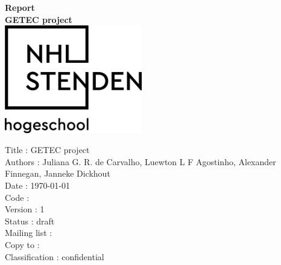 \documentclass[oneside,12pt]{article}
\begin{document}
\setlength{\parindent}{0 em}    %
\setlength{\parskip}{0.7 em}    %
\renewcommand{\baselinestretch}{1.5}    %

\newcommand{\ProjectTitle}{GETEC project} %

\begin{titlepage}
    \begin{center}
    \vspace*{3 cm}
    \Huge
    \textbf{Report} \\
    \vspace{1 cm}    
    \textbf{\ProjectTitle} %
    \\
    \vspace{1 cm}
    \vfill      %
    \includegraphics[width=60mm]{figures/NHLStenden-logo.png} \\
    \end{center}
    \vspace{2 cm}
    \normalsize
    Title : \ProjectTitle %
    \\
    Authors : Juliana G. R. de Carvalho, Luewton L F Agostinho, Alexander Finnegan, Janneke Dickhout
    \\
    Date : \today 
    \\
    Code : 
    \\
    Version : 1 \\
    Status : draft \\
    Mailing list : 
    \\
    Copy to : \\
    Classification : confidential
\end{titlepage}

\end{document}
